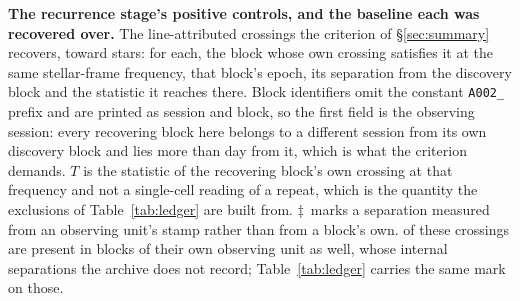 \begin{table}
\centering
\caption{\textbf{The recurrence stage's positive controls, and the baseline
each was recovered over.} The \QcNCtl{} line-attributed crossings the
criterion of \S\ref{sec:summary} recovers, toward \QcNStar{} stars: for each,
the block whose own crossing satisfies it at the same stellar-frame
frequency, that block's epoch, its separation from the discovery block and
the statistic it reaches there. Block identifiers omit the constant
\texttt{A002\_} prefix and are printed as session and block, so the first
field is the observing session: every recovering block here belongs to a
different session from its own discovery block and lies more than \EpSep{}
day from it, which is what the criterion demands. $T$ is the statistic of the
recovering block's own crossing at that frequency and not a single-cell
reading of a repeat, which is the quantity the \RcNExcl{} exclusions of
Table~\ref{tab:ledger} are built from. $\ddagger$~marks a separation measured
from an observing unit's stamp rather than from a block's own.
\QcNUnrecWord{} of these crossings are present in blocks of their own
observing unit as well, whose internal separations the archive does not record;
Table~\ref{tab:ledger} carries the same mark on those.}
\label{tab:confirm}
\small

\end{table}
